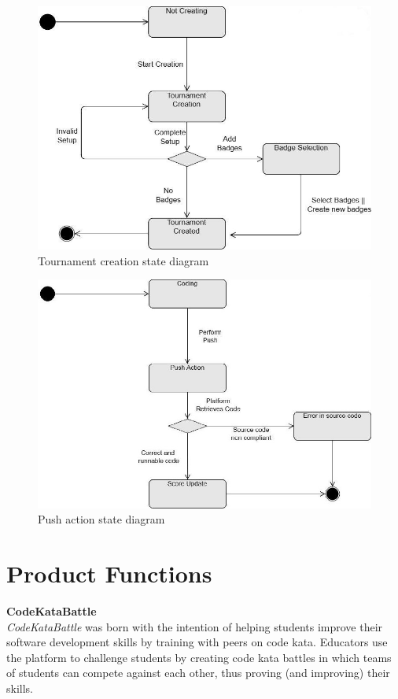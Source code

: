 \begin{figure}[H]
    \begin{center}
        \includegraphics[width=0.9\linewidth]{Images/Tournament_creation.jpg}
        \caption{Tournament creation state diagram}
        \label{fig:state_diagram_2}%
    \end{center}
\end{figure}

\begin{figure}[H]
    \begin{center}
        \includegraphics[width=0.9\linewidth]{Images/push-action.jpg}
        \caption{Push action state diagram}
        \label{fig:state_diagram_3}%
    \end{center}
\end{figure}


\section{Product Functions}
\label{sec:product_functions}%
\textbf{CodeKataBattle}\\
\noindent\textit{CodeKataBattle} was born with the intention of helping students improve their software development skills by training with peers on code kata.
Educators use the platform to challenge students by creating code kata battles in which teams of students can compete against each other, thus proving (and improving) their skills.\\

